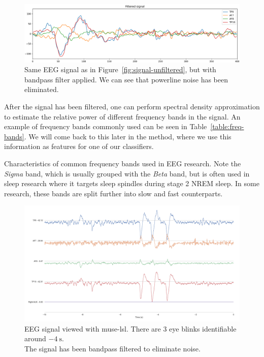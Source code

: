     \begin{figure}[H]
        \includegraphics[width=14cm]{img/raw-signal-postfilter.png}
        \caption{Same EEG signal as in Figure~\ref{fig:signal-unfiltered}, but with bandpass filter applied. We can see that powerline noise has been eliminated.}\label{fig:signal-filtered}
    \end{figure}

    After the signal has been filtered, one can perform spectral density approximation to estimate the relative power of different frequency bands in the signal. An example of frequency bands commonly used can be seen in Table~\ref{table:freq-bands}. We will come back to this later in the method, where we use this information as features for one of our classifiers.

    \begin{table}
        \centering
        
        \caption{Characteristics of common frequency bands used in EEG research. Note the \emph{Sigma} band, which is usually grouped with the \emph{Beta} band, but is often used in sleep research where it targets sleep spindles during stage 2 NREM sleep. In some research, these bands are split further into slow and fast counterparts.}\label{table:freq-bands}
    \end{table}

    \begin{landscape}
        \begin{figure}
            \begin{center}
                \includegraphics[trim=60 50 50 60,clip,width=22cm]{img/muselsl-signal.png}
            \end{center}
            \caption{EEG signal viewed with muse-lsl. There are 3 eye blinks identifiable around $\SI{-4}{\second}$.\\ The signal has been bandpass filtered to eliminate noise.}\label{fig:muselsl-signal}
        \end{figure}
    \end{landscape}

